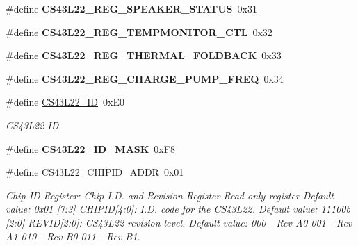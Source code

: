 \begin{DoxyCompactItemize}
\item 
\mbox{\label{group___c_s43_l22___exported___constants_ga3f7e3c607b0f3d685f41daff0e000667}} 
\#define {\bfseries C\+S43\+L22\+\_\+\+R\+E\+G\+\_\+\+S\+P\+E\+A\+K\+E\+R\+\_\+\+S\+T\+A\+T\+US}~0x31
\item 
\mbox{\label{group___c_s43_l22___exported___constants_ga4d9b3ac886d73ddcfa951c853e0678e6}} 
\#define {\bfseries C\+S43\+L22\+\_\+\+R\+E\+G\+\_\+\+T\+E\+M\+P\+M\+O\+N\+I\+T\+O\+R\+\_\+\+C\+TL}~0x32
\item 
\mbox{\label{group___c_s43_l22___exported___constants_ga12fbddc1d2143c1bb9e2e8dc8774267c}} 
\#define {\bfseries C\+S43\+L22\+\_\+\+R\+E\+G\+\_\+\+T\+H\+E\+R\+M\+A\+L\+\_\+\+F\+O\+L\+D\+B\+A\+CK}~0x33
\item 
\mbox{\label{group___c_s43_l22___exported___constants_gaf2e972b2b47a526b29dca6c500e3a5bd}} 
\#define {\bfseries C\+S43\+L22\+\_\+\+R\+E\+G\+\_\+\+C\+H\+A\+R\+G\+E\+\_\+\+P\+U\+M\+P\+\_\+\+F\+R\+EQ}~0x34
\item 
\mbox{\label{group___c_s43_l22___exported___constants_ga61c920fd1a4e4cd0fc56d37ff9e3e2e3}} 
\#define \mbox{\hyperlink{group___c_s43_l22___exported___constants_ga61c920fd1a4e4cd0fc56d37ff9e3e2e3}{C\+S43\+L22\+\_\+\+ID}}~0x\+E0
\begin{DoxyCompactList}\small\item\em C\+S43\+L22 ID ~\newline
 \end{DoxyCompactList}\item 
\mbox{\label{group___c_s43_l22___exported___constants_ga9dbf924b0962401acbd54e6b67064f1c}} 
\#define {\bfseries C\+S43\+L22\+\_\+\+I\+D\+\_\+\+M\+A\+SK}~0x\+F8
\item 
\mbox{\label{group___c_s43_l22___exported___constants_ga8b34c1514aaed772f942050e648491a1}} 
\#define \mbox{\hyperlink{group___c_s43_l22___exported___constants_ga8b34c1514aaed772f942050e648491a1}{C\+S43\+L22\+\_\+\+C\+H\+I\+P\+I\+D\+\_\+\+A\+D\+DR}}~0x01
\begin{DoxyCompactList}\small\item\em Chip ID Register\+: Chip I.\+D. and Revision Register Read only register Default value\+: 0x01 \mbox{[}7\+:3\mbox{]} C\+H\+I\+P\+ID\mbox{[}4\+:0\mbox{]}\+: I.\+D. code for the C\+S43\+L22. Default value\+: 11100b \mbox{[}2\+:0\mbox{]} R\+E\+V\+ID\mbox{[}2\+:0\mbox{]}\+: C\+S43\+L22 revision level. Default value\+: 000 -\/ Rev A0 001 -\/ Rev A1 010 -\/ Rev B0 011 -\/ Rev B1. \end{DoxyCompactList}\end{DoxyCompactItemize}


